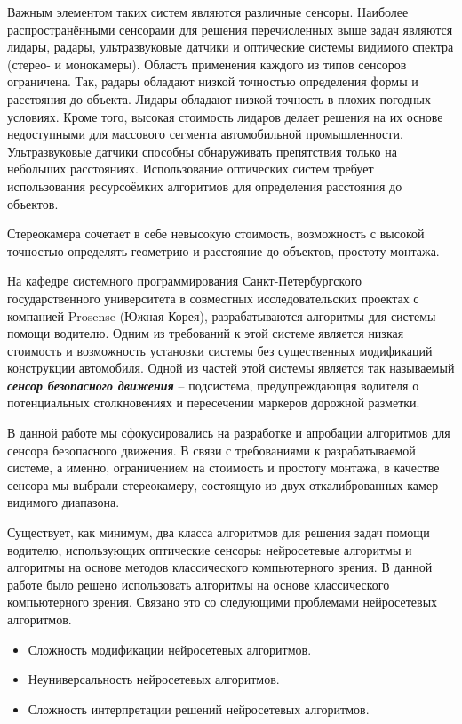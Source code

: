 \documentclass[aps,%
14pt,%
final,%
oneside,
onecolumn,%
musixtex, %
superscriptaddress,%
centertags]{extarticle} %
\begin{document}
Важным элементом таких систем являются различные сенсоры. Наиболее распространёнными сенсорами для решения перечисленных выше задач являются лидары, радары, ультразвуковые датчики и оптические системы видимого спектра (стерео- и монокамеры). Область применения каждого из типов сенсоров ограничена\cite{lu2005technical, ziebinski2016survey}. Так, радары обладают низкой точностью определения формы и расстояния до объекта. Лидары обладают низкой точность в плохих погодных условиях. Кроме того, высокая стоимость лидаров делает решения на их основе недоступными для массового сегмента автомобильной промышленности. Ультразвуковые датчики способны обнаруживать препятствия только на небольших расстояниях. Использование оптических систем требует использования ресурсоёмких алгоритмов для определения расстояния до объектов. 

Стереокамера сочетает в себе невысокую стоимость, возможность с высокой точностью определять геометрию и расстояние до объектов, простоту монтажа.


На кафедре системного программирования Санкт-Петербургского государственного университета в совместных исследовательских проектах с компанией Prosense\cite{prosense} (Южная Корея), разрабатываются алгоритмы для системы помощи водителю. Одним из требований к этой системе является низкая стоимость и возможность установки системы без существенных модификаций конструкции автомобиля. Одной из частей этой системы является так называемый \textit{\textbf{сенсор безопасного движения}} -- подсистема, предупреждающая водителя о потенциальных столкновениях и пересечении маркеров дорожной разметки.

В данной работе мы сфокусировались на разработке и апробации алгоритмов для сенсора безопасного движения. В связи с требованиями к разрабатываемой системе, а именно, ограничением на стоимость и простоту монтажа, в качестве сенсора мы выбрали стереокамеру, состоящую из двух откалиброванных камер видимого диапазона.

Существует, как минимум, два класса алгоритмов для решения задач помощи водителю, использующих оптические сенсоры: нейросетевые алгоритмы и алгоритмы на основе методов классического компьютерного зрения. В данной работе было решено использовать алгоритмы на основе классического компьютерного зрения. Связано это со следующими проблемами нейросетевых алгоритмов\cite{lipton2016mythos}.
\begin{itemize}
\item Сложность модификации нейросетевых алгоритмов.
\item Неуниверсальность нейросетевых алгоритмов.
\item Сложность интерпретации решений нейросетевых алгоритмов.
\end{itemize}
\end{document}
